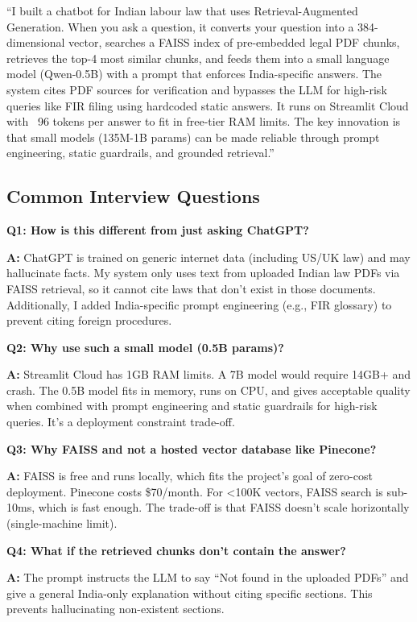 \documentclass[11pt,a4paper]{article}
\begin{document}
``I built a chatbot for Indian labour law that uses Retrieval-Augmented Generation. When you ask a question, it converts your question into a 384-dimensional vector, searches a FAISS index of pre-embedded legal PDF chunks, retrieves the top-4 most similar chunks, and feeds them into a small language model (Qwen-0.5B) with a prompt that enforces India-specific answers. The system cites PDF sources for verification and bypasses the LLM for high-risk queries like FIR filing using hardcoded static answers. It runs on Streamlit Cloud with ~96 tokens per answer to fit in free-tier RAM limits. The key innovation is that small models (135M-1B params) can be made reliable through prompt engineering, static guardrails, and grounded retrieval.''

\subsection{Common Interview Questions}

\textbf{Q1: How is this different from just asking ChatGPT?}

\textbf{A:} ChatGPT is trained on generic internet data (including US/UK law) and may hallucinate facts. My system only uses text from uploaded Indian law PDFs via FAISS retrieval, so it cannot cite laws that don't exist in those documents. Additionally, I added India-specific prompt engineering (e.g., FIR glossary) to prevent citing foreign procedures.

\textbf{Q2: Why use such a small model (0.5B params)?}

\textbf{A:} Streamlit Cloud has 1GB RAM limits. A 7B model would require 14GB+ and crash. The 0.5B model fits in memory, runs on CPU, and gives acceptable quality when combined with prompt engineering and static guardrails for high-risk queries. It's a deployment constraint trade-off.

\textbf{Q3: Why FAISS and not a hosted vector database like Pinecone?}

\textbf{A:} FAISS is free and runs locally, which fits the project's goal of zero-cost deployment. Pinecone costs \$70/month. For <100K vectors, FAISS search is sub-10ms, which is fast enough. The trade-off is that FAISS doesn't scale horizontally (single-machine limit).

\textbf{Q4: What if the retrieved chunks don't contain the answer?}

\textbf{A:} The prompt instructs the LLM to say ``Not found in the uploaded PDFs'' and give a general India-only explanation without citing specific sections. This prevents hallucinating non-existent sections.
\end{document}
